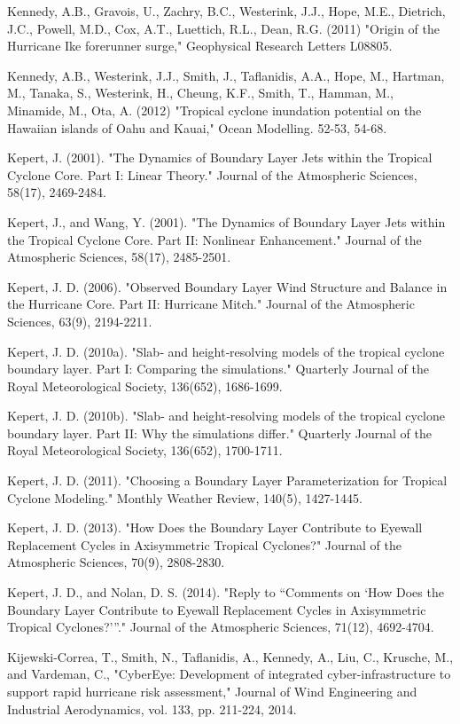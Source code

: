 Kennedy, A.B., Gravois, U., Zachry, B.C., Westerink, J.J., Hope, M.E., Dietrich, J.C., Powell, M.D., Cox, A.T., Luettich, R.L., Dean, R.G. (2011) "Origin of the Hurricane Ike forerunner surge," Geophysical Research Letters L08805. 

Kennedy, A.B., Westerink, J.J., Smith, J., Taflanidis, A.A., Hope, M., Hartman, M., Tanaka, S., Westerink, H., Cheung, K.F., Smith, T., Hamman, M., Minamide, M., Ota, A. (2012) "Tropical cyclone inundation potential on the Hawaiian islands of Oahu and Kauai," Ocean Modelling. 52-53, 54-68. 

Kepert, J. (2001). "The Dynamics of Boundary Layer Jets within the Tropical Cyclone Core. Part I: Linear Theory." Journal of the Atmospheric Sciences, 58(17), 2469-2484.

Kepert, J., and Wang, Y. (2001). "The Dynamics of Boundary Layer Jets within the Tropical Cyclone Core. Part II: Nonlinear Enhancement." Journal of the Atmospheric Sciences, 58(17), 2485-2501.

Kepert, J. D. (2006). "Observed Boundary Layer Wind Structure and Balance in the Hurricane Core. Part II: Hurricane Mitch." Journal of the Atmospheric Sciences, 63(9), 2194-2211.

Kepert, J. D. (2010a). "Slab‐ and height‐resolving models of the tropical cyclone boundary layer. Part I: Comparing the simulations." Quarterly Journal of the Royal Meteorological Society, 136(652), 1686-1699.

Kepert, J. D. (2010b). "Slab‐ and height‐resolving models of the tropical cyclone boundary layer. Part II: Why the simulations differ." Quarterly Journal of the Royal Meteorological Society, 136(652), 1700-1711.

Kepert, J. D. (2011). "Choosing a Boundary Layer Parameterization for Tropical Cyclone Modeling." Monthly Weather Review, 140(5), 1427-1445.

Kepert, J. D. (2013). "How Does the Boundary Layer Contribute to Eyewall Replacement Cycles in Axisymmetric Tropical Cyclones?" Journal of the Atmospheric Sciences, 70(9), 2808-2830.

Kepert, J. D., and Nolan, D. S. (2014). "Reply to “Comments on ‘How Does the Boundary Layer Contribute to Eyewall Replacement Cycles in Axisymmetric Tropical Cyclones?’”." Journal of the Atmospheric Sciences, 71(12), 4692-4704.

Kijewski-Correa, T., Smith, N., Taflanidis, A., Kennedy, A., Liu, C., Krusche, M., and Vardeman, C., "CyberEye: Development of integrated cyber-infrastructure to support rapid hurricane risk assessment," Journal of Wind Engineering and Industrial Aerodynamics, vol. 133, pp. 211-224, 2014.

